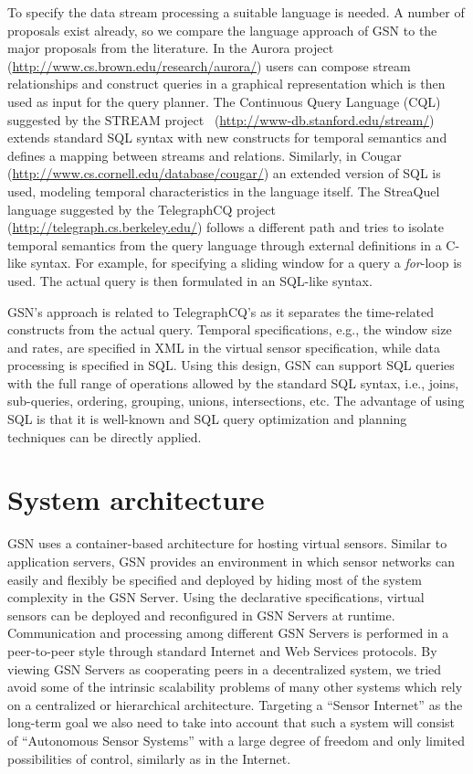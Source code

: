To specify the data stream processing a suitable language is needed. A number
of proposals exist already, so we compare the language approach of GSN to the
major proposals from the literature. In the Aurora project~\cite{Cherniack03}
(\url{http://www.cs.brown.edu/research/aurora/}) users can compose stream
relationships and construct queries in a graphical representation which is then
used as input for the query planner.  The Continuous Query Language (CQL)
suggested by the STREAM project~\cite{Arasu06}
(\url{http://www-db.stanford.edu/stream/}) extends standard SQL syntax with new
constructs for temporal semantics and defines a mapping between streams and
relations. Similarly, in Cougar~\cite{Yao03}
(\url{http://www.cs.cornell.edu/database/cougar/}) an extended version of SQL
is used, modeling temporal characteristics in the language itself. The
StreaQuel language suggested by the TelegraphCQ project~\cite{Chandrasekaran03}
(\url{http://telegraph.cs.berkeley.edu/}) follows a different path and tries to
isolate temporal semantics from the query language through external definitions
in a C-like syntax. For example, for specifying a sliding window for a query a
\textit{for}-loop is used. The actual query is then formulated in an SQL-like
syntax.

GSN's approach is related to TelegraphCQ's as it separates the
time-related constructs from the actual query. Temporal
specifications, e.g., the window size and rates, are specified in XML in the
virtual sensor specification, while data processing is specified in
SQL. Using this design, GSN can support SQL queries with the full range of
operations allowed by the standard SQL syntax, i.e., joins,
sub-queries, ordering, grouping, unions, intersections, etc.
The advantage of using SQL is that it is well-known and SQL query
optimization and planning techniques can be directly applied.

\section{System architecture}
\label{sec:system-architecture}

GSN uses a container-based architecture for hosting virtual sensors.
Similar to application servers, GSN provides an environment in which
sensor networks can easily and flexibly be specified and deployed by
hiding most of the system complexity in the GSN Server.  Using the
declarative specifications, virtual sensors can be deployed and
reconfigured in GSN Servers at runtime. Communication and
processing among different GSN Servers is performed in a
peer-to-peer style through standard Internet and Web Services protocols. By
viewing GSN Servers as cooperating peers in a decentralized system,
we tried avoid some of the intrinsic scalability problems of many
other systems which rely on a centralized or hierarchical
architecture. Targeting a ``Sensor Internet'' as the long-term goal we
also need to take into account that such a system will consist of
``Autonomous Sensor Systems'' with a large degree of freedom and only
limited possibilities of control, similarly as in the Internet.


